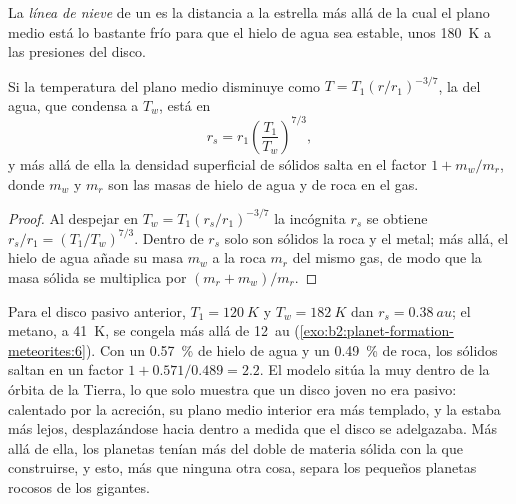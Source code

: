 \begin{definition}\label{def:b2:planet-formation-meteorites:snow-line}
La \emph{línea de nieve} de un  es la distancia
a la estrella más allá de la cual el plano medio está lo bastante frío para que el hielo de agua sea
estable, unos \qty{180}{K} a las presiones del disco.
\end{definition}

\begin{proposition}
\label{prop:b2:planet-formation-meteorites:snow-line}
Si la temperatura del plano medio disminuye como $T = T_1 (r/r_1)^{-3/7}$, la  del
agua, que condensa a $T_w$, está en
\[
  r_s = r_1 \left(\frac{T_1}{T_w}\right)^{7/3},
\]
y más allá de ella la densidad superficial de sólidos salta en el factor $1 + m_w/m_r$,
donde $m_w$ y $m_r$ son las masas de hielo de agua y de roca en el gas.
\end{proposition}

\begin{proof}
Al despejar en $T_w = T_1 (r_s/r_1)^{-3/7}$ la incógnita $r_s$ se obtiene
$r_s/r_1 = (T_1/T_w)^{7/3}$. Dentro de $r_s$ solo son sólidos la roca y el metal; más allá,
el hielo de agua añade su masa $m_w$ a la roca $m_r$ del mismo gas, de modo que la
masa sólida se multiplica por $(m_r + m_w)/m_r$.
\end{proof}

Para el disco pasivo anterior, $T_1 = \qty{120}{K}$ y $T_w = \qty{182}{K}$ dan
$r_s = \qty{0.38}{au}$; el metano, a \qty{41}{K}, se congela más allá de \qty{12}{au}
(\cref{exo:b2:planet-formation-meteorites:6}). Con un \qty{0.57}{\percent} de hielo de agua y un \qty{0.49}{\percent}
de roca, los sólidos saltan en un factor $1 + 0.571/0.489 = 2.2$. El modelo
sitúa la  muy dentro de la órbita de la Tierra, lo que solo muestra que un
disco joven no era pasivo: calentado por la acreción, su plano medio interior era más templado,
y la  estaba más lejos, desplazándose hacia dentro a medida que el disco se adelgazaba. Más allá
de ella, los planetas tenían más del doble de materia sólida con la que construirse, y
esto, más que ninguna otra cosa, separa los pequeños planetas rocosos de los
gigantes.

